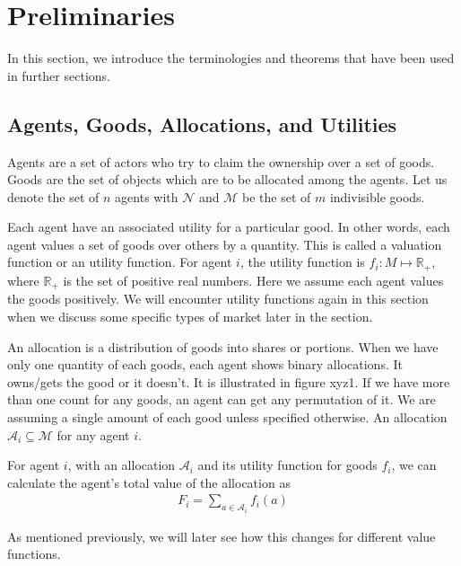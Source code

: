 \section{Preliminaries}
\label{section_prelim}
In this section, we introduce the terminologies and theorems that have been used in further sections.

\subsection{Agents, Goods, Allocations, and Utilities}
Agents are a set of actors who try to claim the ownership over a set of goods. Goods are the set of objects which are to be allocated among the agents. Let us denote the set of $\mathit{n}$ agents with $\mathcal{N}$ and $\mathcal{M}$ be the set of $\mathit{m}$ indivisible goods.

Each agent have an associated utility for a particular good. In other words, each agent values a set of goods over others by a quantity. This is called a valuation function or an utility function. For agent $i$, the utility function is $f_i: M\mapsto \mathbb{R_+}$, where $\mathbb{R_+}$ is the set of positive real numbers. Here we assume each agent values the goods positively. We will encounter utility functions again in this section when we discuss some specific types of market later in the section.

An allocation is a distribution of goods into shares or portions. When we have only one quantity of each goods, each agent shows binary allocations. It owns/gets the good or it doesn't. It is illustrated in figure xyz1. If we have more than one count for any goods, an agent can get any permutation of it. We are assuming a single amount of each good unless specified otherwise. An allocation $\mathcal{A}_i\subseteq \mathcal{M}$ for any agent $i$.

For agent $i$, with an allocation $\mathcal{A}_i$ and its utility function for goods $f_i$, we can calculate the agent's total value of the allocation as
\begin{gather}
    F_i = \sum_{a \in \mathcal{A}_i} f_i(a)
\end{gather}

As mentioned previously, we will later see how this changes for different value functions.


